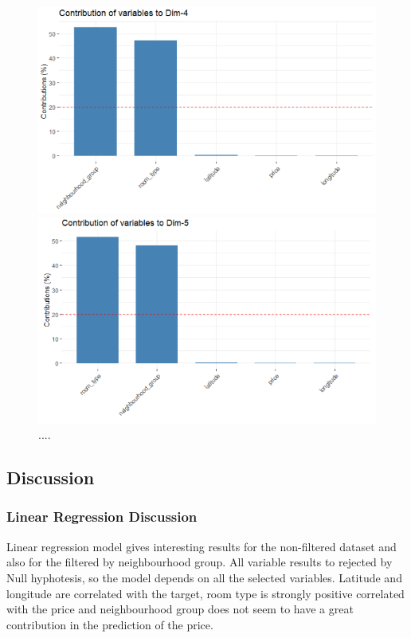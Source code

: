 \documentclass{FR16}
\begin{document}
\begin{figure}[!htb]
\begin{minipage}{0.33\textwidth}
   \end{minipage}\hfill
   \begin{minipage}{0.33\textwidth}
     \centering
     \includegraphics[width=1\linewidth]{figures/FAMD10.png}
   \end{minipage}
   \begin{minipage}{0.33\textwidth}
     \centering
     \includegraphics[width=1\linewidth]{figures/FAMD11.png}
   \end{minipage}
  \caption{\label{fig:34} .... }

\end{figure}

\newpage
\noindent \subsection{Discussion}

\subsubsection{Linear Regression Discussion}
 \noindent Linear regression model gives interesting results for the non-filtered dataset and also for the filtered by neighbourhood group.
All variable results to rejected by Null hyphotesis, so the model depends on all the selected variables.
Latitude and longitude are correlated with the target, room type is strongly positive correlated with the price and neighbourhood group does not seem to have
a great contribution in the prediction of the price.
\\
\end{document}
